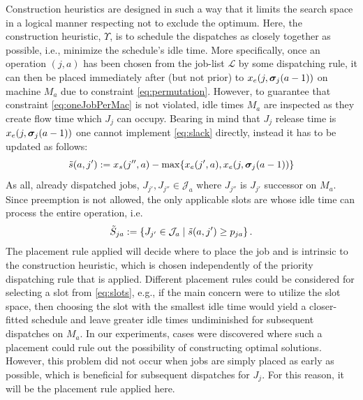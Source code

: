 \documentclass[smallextended]{svjour3}
\begin{document}
	Construction heuristics are designed in such a way that it limits the search 
	space in a logical manner respecting not to exclude the optimum. Here, the 
	construction heuristic, $\Upsilon$, is to schedule the dispatches as closely 
	together as possible, i.e., minimize the schedule's idle time. 
	More specifically, once an operation $(j,a)$ has been chosen from the job-list 
	$\mathcal{L}$ by some dispatching rule, it can then be placed immediately after (but 
	not prior) to $x_e(j,\bm \sigma_j(a-1))$ on machine $M_a$ due to constraint 
	\cref{eq:permutation}. 
	However, to guarantee that constraint \cref{eq:oneJobPerMac} is not violated, 
	idle times $M_a$ are inspected as they create flow time  which $J_j$ can 
	occupy. Bearing in mind that $J_j$ release time is $x_e(j,\bm \sigma_j(a-1))$ one 
	cannot implement \cref{eq:slack} directly, instead it has to be updated as 
	follows:
	\begin{equation}
	\tilde{s}(a,j'):= x_s(j'',a)-\max\{x_e(j',a),x_e(j,\vsigma_j(a-1))\} %
	\end{equation}
	As all, already dispatched jobs, $J_{j'},J_{j''}\in \mathcal{J}_a$ where 
	$J_{j''}$ is $J_{j'}$ successor on $M_a$. Since preemption is not allowed, the 
	only applicable slots are whose idle time can process the entire operation, 
	i.e.
	\begin{equation}
	\tilde{S}_{ja} := \left\{J_{j'}\in \mathcal{J}_a\;\middle|\;\tilde{s}(a,j')\geq p_{ja} 
	\right\}\label{eq:slots}.
	\end{equation} 
	The placement rule applied will decide where to place the job and is intrinsic 
	to the construction heuristic, which is chosen independently of the priority 
	dispatching rule that is applied. 
	Different placement rules could be considered for selecting a slot from 
	\cref{eq:slots}, e.g., if the main concern were to utilize the slot space, then 
	choosing the slot with the smallest idle time would yield a closer-fitted 
	schedule and leave greater idle times undiminished for subsequent dispatches 
	on $M_a$.
	In our experiments, cases were discovered where such a placement could rule out 
	the possibility of constructing optimal solutions.
	However, this problem did not occur when jobs are simply placed as early as 
	possible, which is beneficial for subsequent dispatches for $J_j$. 
	For this reason, it will be the placement rule applied here.
	
\end{document}

